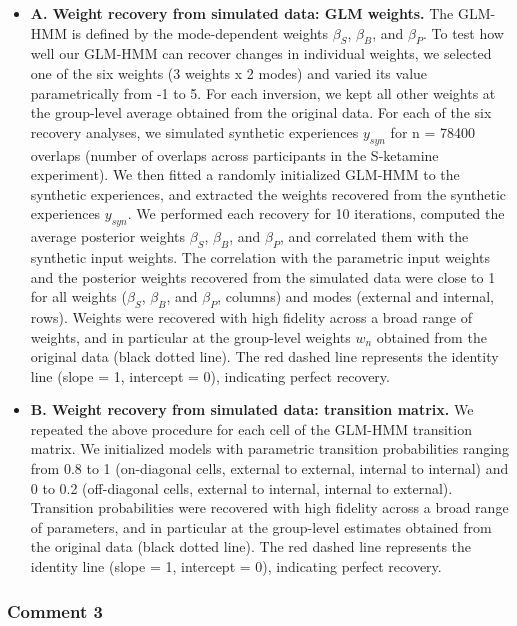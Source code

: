 \documentclass[
]{article}
\begin{document}
\begin{itemize}
\item
  \textbf{A. Weight recovery from simulated data: GLM weights.} The
  GLM-HMM is defined by the mode-dependent weights \(\beta_S\),
  \(\beta_B\), and \(\beta_P\). To test how well our GLM-HMM can recover
  changes in individual weights, we selected one of the six weights (3
  weights x 2 modes) and varied its value parametrically from -1 to 5.
  For each inversion, we kept all other weights at the group-level
  average obtained from the original data. For each of the six recovery
  analyses, we simulated synthetic experiences \(y_{syn}\) for n = 78400
  overlaps (number of overlaps across participants in the S-ketamine
  experiment). We then fitted a randomly initialized GLM-HMM to the
  synthetic experiences, and extracted the weights recovered from the
  synthetic experiences \(y_{syn}\). We performed each recovery for 10
  iterations, computed the average posterior weights \(\beta_S\),
  \(\beta_B\), and \(\beta_P\), and correlated them with the synthetic
  input weights. The correlation with the parametric input weights and
  the posterior weights recovered from the simulated data were close to
  1 for all weights (\(\beta_S\), \(\beta_B\), and \(\beta_P\), columns)
  and modes (external and internal, rows). Weights were recovered with
  high fidelity across a broad range of weights, and in particular at
  the group-level weights \(w_n\) obtained from the original data (black
  dotted line). The red dashed line represents the identity line (slope
  = 1, intercept = 0), indicating perfect recovery.
\item
  \textbf{B. Weight recovery from simulated data: transition matrix.} We
  repeated the above procedure for each cell of the GLM-HMM transition
  matrix. We initialized models with parametric transition probabilities
  ranging from 0.8 to 1 (on-diagonal cells, external to external,
  internal to internal) and 0 to 0.2 (off-diagonal cells, external to
  internal, internal to external). Transition probabilities were
  recovered with high fidelity across a broad range of parameters, and
  in particular at the group-level estimates obtained from the original
  data (black dotted line). The red dashed line represents the identity
  line (slope = 1, intercept = 0), indicating perfect recovery.
\end{itemize}

\subsubsection{Comment 3}\label{comment-3-1}
\end{document}
